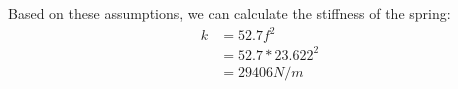 \documentclass[paper=a4, fontsize=11pt]{scrartcl} %
\numberwithin{equation}{section} %
\numberwithin{figure}{section} %
\numberwithin{table}{section} %
\begin{document}
Based on these assumptions, we can calculate the stiffness of the
spring:
\begin{align}
  k    &=  52.7 f^2 \\
       &=  52.7 * 23.622^2 \\
       &=  29406 N/m
\end{align}

   
   
   
   
\end{document}
